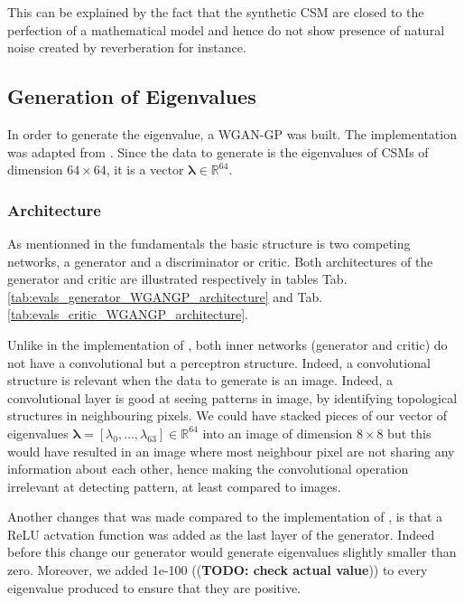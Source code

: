 \documentclass{article}
\begin{document}
This can be explained by the fact that the synthetic CSM are closed to the perfection of a mathematical model and hence do not show presence of natural noise created by reverberation for instance.   


    


\subsection{Generation of Eigenvalues}

In order to generate the eigenvalue, a WGAN-GP was built. The implementation was adapted from \cite{nain2020wgangp}. Since the data to generate is the eigenvalues of CSMs of dimension $64 \times 64$, it is a vector $\mathbf{\lambda} \in \mathbb{R}^{64}$.

\subsubsection{Architecture}

As mentionned in the fundamentals the basic structure is two competing networks, a generator and a discriminator or critic. Both architectures of the generator and critic are illustrated respectively in tables Tab.\ref{tab:evals_generator_WGANGP_architecture} and Tab.\ref{tab:evals_critic_WGANGP_architecture}.

Unlike in the implementation of \cite{nain2020wgangp}, both inner networks (generator and critic) do not have a convolutional but a perceptron structure. Indeed, a convolutional structure is relevant when the data to generate is an image. Indeed, a convolutional layer is good at seeing patterns in image, by identifying topological structures in neighbouring pixels. We could have stacked pieces of our vector of eigenvalues $\mathbf{\lambda} = [\lambda_0, \dots, \lambda_{63}] \in \mathbb{R}^{64}$  into an image of dimension $8 \times 8$ but this would have resulted in an image where most neighbour pixel are not sharing any information about each other, hence making the convolutional operation irrelevant at detecting pattern, at least compared to images. 

Another changes that was made compared to the implementation of \cite{nain2020wgangp}, is that a ReLU actvation function was added as the last layer of the generator. Indeed before this change our generator would generate eigenvalues slightly smaller than zero. Moreover, we added 1e-100 ((\textbf{TODO: check actual value})) to every eigenvalue produced to ensure that they are positive.
\end{document}
